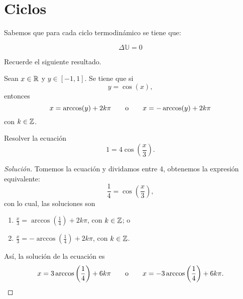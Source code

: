 \documentclass[a4,11pt]{aleph-notas}
\begin{document}
\encabezado

\vspace*{-8mm}
\section{Ciclos}

\begin{advertencia}
    Sabemos que para cada ciclo termodinámico se tiene que:

    $$\Delta \mathbb{U}=0$$
\end{advertencia}

Recuerde el siguiente resultado.

\begin{teo}
    Sean $x\in \mathbb{R}$ y $y\in [-1,1]$. Se tiene que si
    \[
        y =\cos(x),
    \]
    entonces
    \[
        x = \arccos(y) + 2k\pi
        \qquad\text{o}\qquad
        x = -\arccos(y) + 2k\pi
    \]
    con $k\in\mathbb{Z}$.
\end{teo}

\begin{ejer}
    Resolver la ecuación
    \[
        1=4\cos\left(\frac{x}{3}\right).
    \]
\end{ejer}

\begin{proof}[Solución]
    Tomemos la ecuación y dividamos entre 4, obtenemos la expresión equivalente:
    \[
        \frac{1}{4}=\cos\left(\frac{x}{3}\right),
    \]
    con lo cual, las soluciones son
    \begin{enumerate}[label=\textit{\alph*)}]
        \item\label{ej01:c01} $\displaystyle \frac{x}{3}=\arccos\left(\frac{1}{4}\right)+2k\pi$, con $k\in\mathbb{Z}$; o
        \item\label{ej01:c02} $\displaystyle \frac{x}{3}=-\arccos\left(\frac{1}{4}\right)+2k\pi$, con $k\in\mathbb{Z}$.
    \end{enumerate}
    Así, la solución de la ecuación es
    \[
        x=3\arccos\left(\frac{1}{4}\right)+6k\pi
        \qquad\text{o}\qquad
        x=-3\arccos\left(\frac{1}{4}\right)+6k\pi.\qedhere
    \]
\end{proof}
\end{document}
